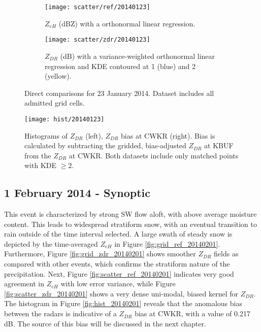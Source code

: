 \begin{figure}[H]
\centering
   \begin{subfigure}[t]{0.48\linewidth} \centering
     \texttt{[image: scatter/ref/20140123]}
     \caption{$Z_{eH}$ (dBZ) with a orthonormal linear regression.}\label{fig:scatter_ref_20140123}
   \end{subfigure}
   \begin{subfigure}[t]{0.48\linewidth} \centering
     \texttt{[image: scatter/zdr/20140123]}
     \caption{$Z_{DR}$ (dB) with a variance-weighted orthonormal linear regression and KDE contoured at 1 (blue) and 2 (yellow).}\label{fig:scatter_zdr_20140123}
   \end{subfigure}
\caption{Direct comparisons for 23 January 2014. Dataset includes all admitted grid cells.}
\label{fig:scatter_20140123}
\end{figure}

\begin{figure}[H]
\texttt{[image: hist/20140123]}\centering
\caption{Histograms of $Z_{DR}$ (left), $Z_{DR}$ bias at CWKR (right). Bias is calculated by subtracting the gridded, bias-adjusted $Z_{DR}$ at KBUF from the
$Z_{DR}$ at CWKR. Both datasets include only matched points with KDE $\geq 2$. } 
\label{fig:hist_20140123}
\end{figure}

\subsection{1 February 2014 - Synoptic}
This event is characterized by strong SW flow aloft, with above average moisture content. This leads to
widespread stratiform snow, with an eventual transition to rain outside of the time interval selected.
A large swath of steady snow is depicted by the time-averaged $Z_{eH}$ in Figure \ref{fig:grid_ref_20140201}. 
Furthermore, Figure \ref{fig:grid_zdr_20140201} shows smoother $Z_{DR}$
fields as compared with other events, which confirms the stratiform nature of the precipitation. Next, Figure \ref{fig:scatter_ref_20140201} indicates very
good agreement in $Z_{eH}$ with low error variance, while Figure \ref{fig:scatter_zdr_20140201} shows a very dense uni-modal, biased kernel for $Z_{DR}$. The
histogram in Figure \ref{fig:hist_20140201} reveals that the anomalous bias between the radars is indicative of a $Z_{DR}$ bias at CWKR, with a value of
0.217 dB. The source of this bias will be discussed in the next chapter.

